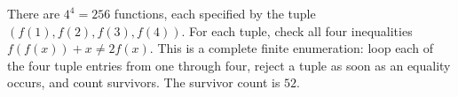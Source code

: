 There are $4^4=256$ functions, each specified by the tuple $(f(1),f(2),f(3),f(4))$. For each tuple, check all four inequalities $f(f(x))+x\ne2f(x)$. This is a complete finite enumeration: loop each of the four tuple entries from one through four, reject a tuple as soon as an equality occurs, and count survivors. The survivor count is $\boxed{52}$.
